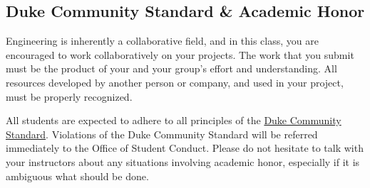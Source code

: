 \subsection*{Duke Community Standard \& Academic Honor} Engineering is
inherently a collaborative field, and in this class, you are encouraged to work
collaboratively on your projects.  The work that you submit must be the product
of your and your group's effort and understanding.  All resources developed by
another person or company, and used in your project, must be properly
recognized.

All students are expected to adhere to all principles of the
\href{http://www.integrity.duke.edu/standard.html}{Duke Community Standard}.
Violations of the Duke Community Standard will be referred immediately to the
Office of Student Conduct.  Please do not hesitate to talk with your instructors
about any situations involving academic honor, especially if it is ambiguous
what should be done.


